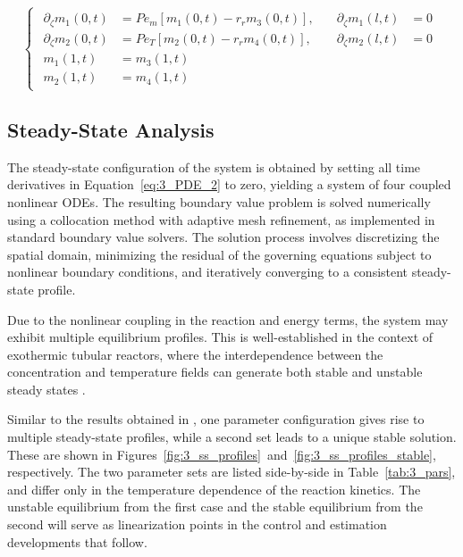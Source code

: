 \begin{equation} \label{eq:3_BC_3}
\begin{cases}
\begin{alignedat}{2}
    \partial_\zeta m_1(0, t) &= Pe_m \left[ m_1(0, t) - r_r m_3(0, t) \right], \quad &\partial_{\zeta} m_1(l, t) &= 0 \\[1.5ex]

    \partial_\zeta m_2(0, t) &= Pe_T \left[ m_2(0, t) - r_r m_4(0, t) \right], \quad &\partial_{\zeta} m_2(l, t) &= 0 \\[1.5ex]

    m_1(1, t) &= m_3(1, t) \\[1.5ex]

    m_2(1, t) &= m_4(1, t)
\end{alignedat}
\end{cases}
\end{equation}


\subsection{Steady-State Analysis}

The steady-state configuration of the system is obtained by setting all time derivatives in Equation~\eqref{eq:3_PDE_2} to zero, yielding a system of four coupled nonlinear ODEs. The resulting boundary value problem is solved numerically using a collocation method with adaptive mesh refinement, as implemented in standard boundary value solvers. The solution process involves discretizing the spatial domain, minimizing the residual of the governing equations subject to nonlinear boundary conditions, and iteratively converging to a consistent steady-state profile.

Due to the nonlinear coupling in the reaction and energy terms, the system may exhibit multiple equilibrium profiles. This is well-established in the context of exothermic tubular reactors, where the interdependence between the concentration and temperature fields can generate both stable and unstable steady states \autocite{Heinemann1982effect, Hastir2020Analysis}.

Similar to the results obtained in \autocite{Khatibi2021Model}, one parameter configuration gives rise to multiple steady-state profiles, while a second set leads to a unique stable solution. These are shown in Figures~\ref{fig:3_ss_profiles}~and~\ref{fig:3_ss_profiles_stable}, respectively. The two parameter sets are listed side-by-side in Table~\ref{tab:3_pars}, and differ only in the temperature dependence of the reaction kinetics. The unstable equilibrium from the first case and the stable equilibrium from the second will serve as linearization points in the control and estimation developments that follow.

